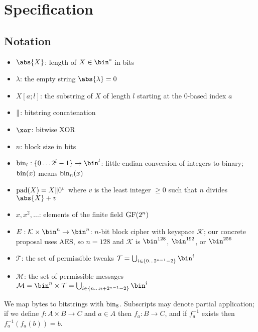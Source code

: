 \documentclass[hctr.tex]{subfiles}
\begin{document}
\section{Specification}\label{specification}
\subsection{Notation}
\begin{itemize}
    \item $\abs{X}$: length of $X \in \bin^{*}$ in bits
    \item $\lambda$: the empty string $\abs{\lambda} = 0$
    \item $X[a;l]$: the substring of $X$ of length $l$ starting at the 0-based index $a$
    \item $\Vert$: bitstring concatenation
    \item \(\xor\): bitwise XOR
    \item \(n\): block size in bits
    \item $\fromint_l: \{0 \ldots 2^l-1\} \rightarrow \bin^l$:
    little-endian conversion of integers to binary; 
    \(\operatorname{bin}(x)\) means \(\operatorname{bin}_n(x)\)
    \item $\operatorname{pad}(X) = X \Vert 0^v$
    where $v$ is the least integer $\geq 0$ such that $n$ divides $\abs{X} + v$
    \item \(x, x^2, \ldots\): elements of the finite field \(\operatorname{GF}(2^n)\)
    \item \(E: \mathcal{K} \times \bin^n \rightarrow \bin^n\): 
    \(n\)-bit block cipher with keyspace \(\mathcal{K}\);
    our concrete proposal uses AES\cite{aes},
    so \(n=128\) and \(\mathcal{K}\) is
    \(\bin^{128}\), \(\bin^{192}\), or \(\bin^{256}\)
    \item \(\mathcal{T}\): the set of permissible tweaks
    \(\mathcal{T} = \bigcup_{i \in \{0\ldots2^{n-1}-2\}}\bin^i\)
    \item \(\mathcal{M}\): the set of permissible messages
    \(\mathcal{M} = \bin^n \times \mathcal{T} = \bigcup_{i \in \{n\ldots n + 2^{n-1}-2\}}\bin^i\)
\end{itemize}
We map bytes to bitstrings with \(\operatorname{bin}_8\). Subscripts may denote partial application; if we define $f: A \times B \rightarrow C$ and
$a \in A$ then $f_a: B \rightarrow C$, and if $f_a^{-1}$ exists then $f_a^{-1}(f_a(b)) = b$.
\end{document}
